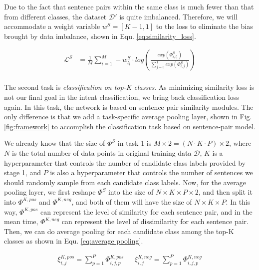 Due  to  the  fact that sentence pairs within the same class is much fewer than
that from  different  classes,  the  dataset  $\mathcal{D'}$  is
quite imbalanced.  Therefore, we will accommodate a weight variable $w^S = [K-1, 1]$
to  the  loss  to eliminate the bias brought by data imbalance, shown in Equ.
\ref{eq:similarity_loss}.

\vspace{-1.5em}
\begin{equation}
  \begin{aligned}
    \mathcal{L}^{S}&=\frac{1}{M}\sum_{i=1}^{M}-w^S_{l_i}\cdot log(\frac{exp(\varPhi_{i,l_{i}}^S)}{\sum_{j=0}^{1}exp(\varPhi_{i,j}^S)}) \\
    \label{eq:similarity_loss}
  \end{aligned}
\end{equation}
\vspace{-2em}

The  second  task  is  \emph{classification  on  top-K classes}. As minimizing
similarity  loss  is  not  our  final goal in the intent classification, we
bring  back  classification  loss again. In this task, the network is based on
sentence  pair  similarity  modules.  The  only  difference  is  that we add a
task-specific  average  pooling  layer,  shown  in Fig. \ref{fig:framework} to
accomplish the classification task based on sentence-pair model.

We  already  know  that the size of ${\Phi}^S$ in task 1 is $M\times 2=(N\cdot
K\cdot  P)\times  2$, where $N$ is the total number of data points in original
training  data $\mathcal{D}$, $K$ is a hyperparameter that controls the number
of   candidate   class  labels  provided  by  stage  1,  and  $P$  is  also  a
hyperparameter that controls the number of sentences we should randomly sample
from each candidate class labels. Now, for the average pooling layer, we first
reshape  ${\Phi}^S$  into  the  size  of $N\times K\times P\times 2$, and then
split  it  into  ${\Phi}^{K,pos}$  and ${\Phi}^{K,neg}$, and both of them will
have  the  size  of  $N\times  K\times  P$.  In this way, ${\Phi}^{K,pos}$ can
represent  the  level  of  similarity  for each sentence pair, and in the mean
time,  ${\Phi}^{K,neg}$  can  represent  the  level  of dissimilarity for each
sentence  pair. Then, we can do average pooling for each candidate class among
the  top-K  classes  as  shown  in  Equ.  \ref{eq:average  pooling}.

\vspace{-2em}
\begin{align}
  {\xi}_{i,j}^{K,pos} = \sum_{p=1}^{P}{\varPhi}_{i,j,p}^{K,pos} \ \ \ \ \ \ \ 
  {\xi}_{i,j}^{K,neg} = \sum_{p=1}^{P}{\varPhi}_{i,j,p}^{K,neg}
  \label{eq:average pooling}
\end{align}

